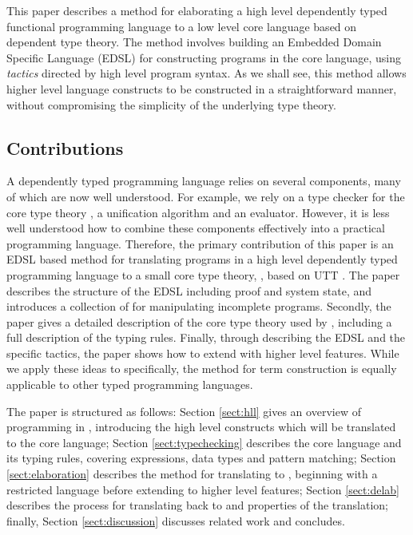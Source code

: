This paper describes a method for elaborating a high level dependently typed
functional programming language to a low level core language based on dependent
type theory.  The method involves building an Embedded Domain Specific Language
(EDSL) for constructing programs in the core language, using \emph{tactics}
directed by high level program syntax.  
As we shall see, this method allows higher level language constructs to be
constructed in a straightforward manner, without compromising the simplicity
of the underlying type theory.

\subsection{Contributions}


A dependently typed programming language relies on several components, many of
which are now well understood. For example, we rely on a type checker for
the core type theory \cite{Chapman2005epigram,loh2010tutorial}, a
unification algorithm \cite{Miller1992} and an evaluator. However, it is less
well understood how to combine these components effectively into a practical
programming language. 
Therefore, the primary contribution of this paper is
an EDSL based method for translating programs in a
high level dependently typed programming language to a small core type theory,
\TT{}, based on UTT \cite{luo1994}. The paper describes the structure of the
EDSL including proof and system state, and introduces a collection of 
for manipulating incomplete programs.
Secondly, the paper gives a detailed description of the core type theory used
by \Idris{}, including a full description of the typing rules. Finally, through
describing the EDSL and the specific tactics, the paper shows how to extend
\Idris{} with higher level features.
While we apply these ideas to \Idris{} specifically, the method for term construction
is equally applicable to other typed programming languages.

The paper is structured as follows: Section \ref{sect:hll} gives an overview of
programming in \Idris{}, introducing the high level constructs which will be
translated to the core language; Section \ref{sect:typechecking} describes the
core language \TT{} and its typing rules, covering expressions, data types
and pattern matching; Section \ref{sect:elaboration} describes the method
for translating \Idris{} to \TT{}, beginning with a restricted language
\IdrisM{} before extending to higher level features; Section
\ref{sect:delab} describes the process for translating back to \Idris{}
and properties of the translation; finally, 
Section \ref{sect:discussion} discusses related work and concludes.

